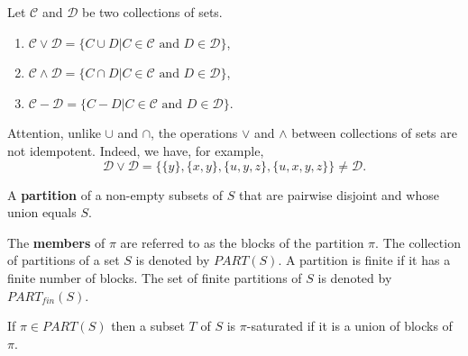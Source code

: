 \documentclass[../main.tex]{subfiles}
\begin{document}
\begin{purple}
\begin{definition}

Let $\mathcal{C}$ and $\mathcal{D}$ be two collections of sets.

\begin{enumerate}
    \item $\mathcal{C} \lor \mathcal{D}=\{C\cup D| C \in \mathcal{C}\text{ and } D \in \mathcal{D}\}$,
    \item $\mathcal{C} \land \mathcal{D}=\{C\cap D| C \in \mathcal{C}\text{ and } D \in \mathcal{D}\}$,
    \item $\mathcal{C} - \mathcal{D}=\{C - D| C \in \mathcal{C}\text{ and } D \in \mathcal{D}\}$.
\end{enumerate}
\end{definition}
\end{purple}

Attention, unlike $\cup$ and $\cap$, the operations $\lor$ and $\land$ between collections of sets are not idempotent. Indeed, we have, for example, 
$$
\mathcal{D}\lor\mathcal{D}=\{\{y\},\{x,y\},\{u, y, z\},\{u,x,y,z\}\}\neq\mathcal{D}.
$$

\begin{purple}
\begin{definition}
A \textbf{partition} of a non-empty subsets of $S$ that are pairwise disjoint and whose union equals $S$. 

The \textbf{members} of $\pi$ are referred to as the blocks of the partition $\pi$. The collection of partitions of a set $S$ is denoted by $PART(S)$. A partition is finite if it has a finite number of blocks. The set of finite partitions of $S$ is denoted by $PART_{fin}(S)$.

If $\pi\in PART(S)$ then a subset $T$ of $S$ is $\pi$-saturated if it is a union of blocks of $\pi$.
\end{definition}
\end{purple}
\end{document}
